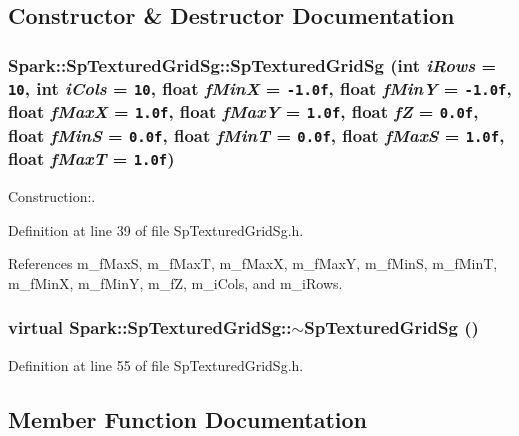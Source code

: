 \subsection{Constructor \& Destructor Documentation}
\subsubsection{\setlength{\rightskip}{0pt plus 5cm}Spark::Sp\-Textured\-Grid\-Sg::Sp\-Textured\-Grid\-Sg (int {\em i\-Rows} = {\tt 10}, int {\em i\-Cols} = {\tt 10}, float {\em f\-Min\-X} = {\tt -1.0f}, float {\em f\-Min\-Y} = {\tt -1.0f}, float {\em f\-Max\-X} = {\tt 1.0f}, float {\em f\-Max\-Y} = {\tt 1.0f}, float {\em f\-Z} = {\tt 0.0f}, float {\em f\-Min\-S} = {\tt 0.0f}, float {\em f\-Min\-T} = {\tt 0.0f}, float {\em f\-Max\-S} = {\tt 1.0f}, float {\em f\-Max\-T} = {\tt 1.0f})\hspace{0.3cm}{\tt  [inline]}}\label{classSpark_1_1SpTexturedGridSg_a0}


Construction:. 

Definition at line 39 of file Sp\-Textured\-Grid\-Sg.h.

References m\_\-f\-Max\-S, m\_\-f\-Max\-T, m\_\-f\-Max\-X, m\_\-f\-Max\-Y, m\_\-f\-Min\-S, m\_\-f\-Min\-T, m\_\-f\-Min\-X, m\_\-f\-Min\-Y, m\_\-f\-Z, m\_\-i\-Cols, and m\_\-i\-Rows.
\subsubsection{\setlength{\rightskip}{0pt plus 5cm}virtual Spark::Sp\-Textured\-Grid\-Sg::$\sim${\bf Sp\-Textured\-Grid\-Sg} ()\hspace{0.3cm}{\tt  [inline, virtual]}}\label{classSpark_1_1SpTexturedGridSg_a1}


Definition at line 55 of file Sp\-Textured\-Grid\-Sg.h.

\subsection{Member Function Documentation}
